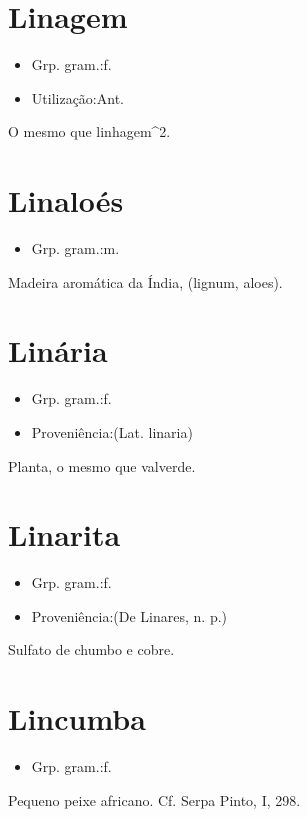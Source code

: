 \section{Linagem}
\begin{itemize}
\item {Grp. gram.:f.}
\end{itemize}
\begin{itemize}
\item {Utilização:Ant.}
\end{itemize}
O mesmo que \textunderscore linhagem\textunderscore ^2.
\section{Linaloés}
\begin{itemize}
\item {Grp. gram.:m.}
\end{itemize}
Madeira aromática da Índia, (\textunderscore lignum, aloes\textunderscore ).
\section{Linária}
\begin{itemize}
\item {Grp. gram.:f.}
\end{itemize}
\begin{itemize}
\item {Proveniência:(Lat. \textunderscore linaria\textunderscore )}
\end{itemize}
Planta, o mesmo que \textunderscore valverde\textunderscore .
\section{Linarita}
\begin{itemize}
\item {Grp. gram.:f.}
\end{itemize}
\begin{itemize}
\item {Proveniência:(De \textunderscore Linares\textunderscore , n. p.)}
\end{itemize}
Sulfato de chumbo e cobre.
\section{Lincumba}
\begin{itemize}
\item {Grp. gram.:f.}
\end{itemize}
Pequeno peixe africano. Cf. Serpa Pinto, I, 298.
